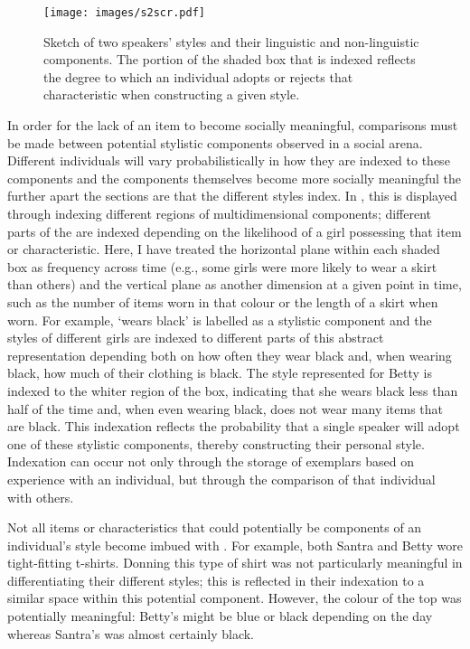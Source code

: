\begin{figure}
	\centering
		\texttt{[image: images/s2scr.pdf]} %
	\caption{Sketch of two speakers' styles and their linguistic and non-linguistic components.  The portion of the shaded box that is indexed reflects the degree to which an individual adopts or rejects that characteristic when constructing a given style.}
	\label{fig:SketchTwoStyles2}
\end{figure}



In order for the lack of an item to become socially meaningful, comparisons must be made between potential stylistic components observed in a social arena.  Different individuals will vary probabilistically in how they are indexed to these components and the components themselves become more socially meaningful the further apart the sections are that the different styles index.  In , this is displayed through indexing different regions of multidimensional components; different parts of the  are indexed depending on the likelihood of a girl possessing that item or characteristic.  Here, I have treated the horizontal plane within each shaded box as frequency across time (e.g., some girls were more likely to wear a skirt than others) and the vertical plane as another dimension at a given point in time, such as the number of items worn in that colour or the length of a skirt when worn.  For example, `wears black' is labelled as a stylistic component and the styles of different girls are indexed to different parts of this abstract representation depending both on how often they wear black and, when wearing black, how much of their clothing is black.  The style represented for Betty is indexed to the whiter region of the box, indicating that she wears black less than half of the time and, when even wearing black, does not wear many items that are black.  This indexation reflects the probability that a single speaker will adopt one of these stylistic components, thereby constructing their personal style.  Indexation can occur not only through the storage of exemplars based on experience with an individual, but through the comparison of that individual with others.  

Not all items or characteristics that could potentially be components of an individual's style become imbued with .  For example, both Santra and Betty wore tight-fitting t-shirts.  Donning this type of shirt was not particularly meaningful in differentiating their different styles; this is reflected in their inde\-xation to a similar space within this potential component.  However, the colour of the top was potentially meaningful: Betty's might be blue or black depending on the day whereas Santra's was almost certainly black.  

